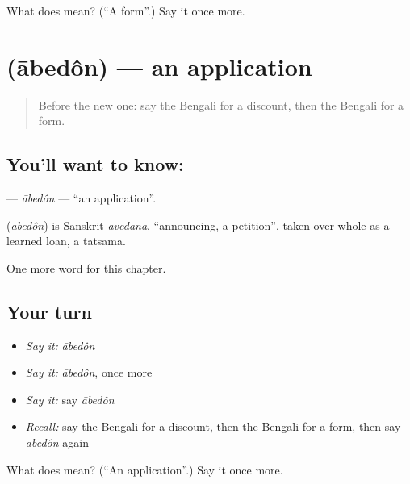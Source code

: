 \begin{tcolorbox}[breakable,colback=teal!4,colframe=teal!35!black,title={Before you move on}]
What does  mean? (\textquotedblleft{}A form\textquotedblright{}.) Say it once more.
\end{tcolorbox}
\section[\texorpdfstring{\bn{আবেদন} (ābedôn)}{আবেদন (ābedôn)}]{ (ābedôn) — an application}

\label{lesson:BN-C259-abedon}



\begin{quote}
Before the new one: say the Bengali for a discount, then the Bengali for a form.
\end{quote}

\subsection*{You'll want to know: }
\textbf{} — \emph{ābedôn} — \textquotedblleft{}an application\textquotedblright{}.

\begin{cousinweb}
\textbf{} (\emph{ābedôn}) is Sanskrit \emph{āvedana}, \textquotedblleft{}announcing, a petition\textquotedblright{}, taken over whole as a learned loan, a tatsama.
\end{cousinweb}

\begin{grammarlens}[title={What you've built}]
One more word for this chapter.
\end{grammarlens}

\subsection*{Your turn}
\begin{itemize}
\raggedright
  \item \emph{Say it:} \emph{ābedôn}
  \item \emph{Say it:} \emph{ābedôn}, once more
  \item \emph{Say it:} say \emph{ābedôn}
  \item \emph{Recall:} say the Bengali for a discount, then the Bengali for a form, then say \emph{ābedôn} again
\end{itemize}

\begin{tcolorbox}[breakable,colback=teal!4,colframe=teal!35!black,title={Before you move on}]
What does  mean? (\textquotedblleft{}An application\textquotedblright{}.) Say it once more.
\end{tcolorbox}
